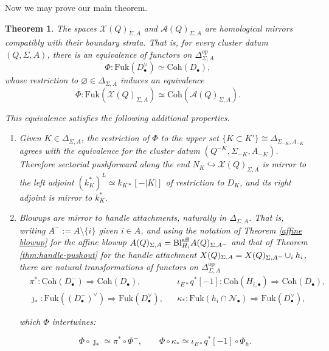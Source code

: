 \documentclass[11pt]{amsart}
\newtheorem{thm}{Theorem}[section]
\theoremstyle{definition}
\theoremstyle{remark}
\newcommand{\A}{\mathcal{A}}
\newcommand{\X}{\mathcal{X}}
\newcommand{\Coh}{\mathrm{Coh}}
\newcommand{\Fuk}{\mathrm{Fuk}}
\renewcommand{\emptyset}{\varnothing}
\numberwithin{equation}{section}
\begin{document}
Now we may prove our main theorem.

\begin{thm}\label{HMS}
The spaces $\mathcal{X}(Q)_{\Sigma, A}$ and $\mathcal{A}(Q)_{\Sigma, A}$ are homological mirrors compatibly with their boundary strata. That is, for every cluster datum $(Q, \Sigma, A)$, there is an equivalence of functors on $\Delta_{\Sigma, A}^{op}$ $$\Phi: \Fuk(D_\bullet^\vee) \simeq \Coh(D_\bullet),$$ \noindent whose restriction to $\emptyset \in \Delta_{\Sigma, A}$ induces an equivalence $$\Phi: \Fuk(\mathcal{X}(Q)_{\Sigma, A}) \simeq \Coh(\mathcal{A}(Q)_{\Sigma, A}).$$

This equivalence satisfies the following additional properties.

\begin{enumerate}
    \item Given $K \in \Delta_{\Sigma, A}$, the restriction of $\Phi$ to the upper set $\{K \subset K'\} \cong \Delta_{\Sigma_{-K}, A_{-K}}$ agrees with the equivalence for the cluster datum $(Q^{-K}, \Sigma_{-K}, A_{-K})$. Therefore sectorial pushforward along the end $N_K 
    \hookrightarrow \mathcal{X}(Q)_{\Sigma, A}$ is mirror to the left adjoint $(k_K^*)^L\simeq k_{K*}[-|K|]$ of restriction to $D_K$, and its right adjoint is mirror to $k_K^*$.

    \item Blowups are mirror to handle attachments, naturally in $\Delta_{\Sigma, A}$. That is, writing $A^-:=A\setminus\{i\}$ given $i \in A$, and using the notation of Theorem \ref{affine blowup} for the affine blowup $\mathcal \A(Q)_{\Sigma,A}=\mathrm{Bl}^{\mathrm{aff}}_{H_i}\mathcal \A(Q)_{\Sigma,A^-}$ and that of Theorem \ref{thm:handle-pushout} for the handle attachment $\mathcal \X(Q)_{\Sigma,A}=\mathcal \X(Q)_{\Sigma,A^-}\cup_ih_i$, there are natural transformations of functors on $\Delta_{\Sigma,A}^{\mathrm{op}}$ 
$$\begin{aligned}&\pi^*\colon \Coh(D^-_\bullet)\Rightarrow \Coh(D_\bullet), &&\iota_{E*}q^*[-1]\colon \Coh(H_{i,\bullet})\Rightarrow \Coh(D_\bullet),\\ &\jmath_*\colon \Fuk((D^-_\bullet)^\vee)\Rightarrow \Fuk(D^\vee_\bullet), &&\kappa_*\colon \Fuk(h_i\cap\mathcal N_\bullet)\Rightarrow \Fuk(D^\vee_\bullet),\end{aligned}$$

\noindent which $\Phi$ intertwines:

$$\Phi\circ\jmath_*\simeq\pi^*\circ\Phi^-,\qquad\Phi\circ\kappa_*\simeq\iota_{E*}q^*[-1]\circ\Phi_h.$$


\end{enumerate}
\end{thm}
\end{document}
